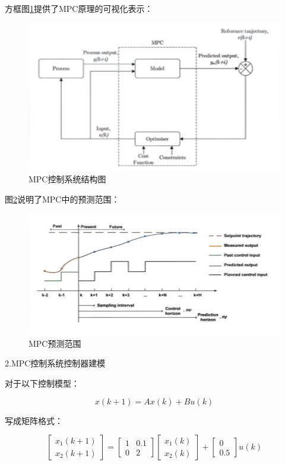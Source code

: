 方框图\ref{Fig:img5}提供了MPC原理的可视化表示：

\begin{figure}[ht]
  \centering
  \includegraphics[width=0.8\linewidth]{./Figure/MPC-Control.png}
  \caption{MPC控制系统结构图}\label{Fig:img5}
\end{figure}

图\ref{Fig:img6}说明了MPC中的预测范围：

\begin{figure}[ht]
  \centering
  \includegraphics[width=0.8\linewidth]{./Figure/MPC-Prediction.png}
  \caption{MPC预测范围}\label{Fig:img6}
\end{figure}

2.MPC控制系统控制器建模

对于以下控制模型：

$$
x(k+1)=A x(k)+B u(k)
$$

写成矩阵格式：

$$
\left[\begin{array}{l}x_{1}(k+1) \\x_{2}(k+1)\end{array}\right]=\left[\begin{array}{cc}1 & 0.1 \\0 & 2\end{array}\right]\left[\begin{array}{l}x_{1}(k) \\x_{2}(k)\end{array}\right]+\left[\begin{array}{c}0 \\0.5\end{array}\right] u(k)
$$

